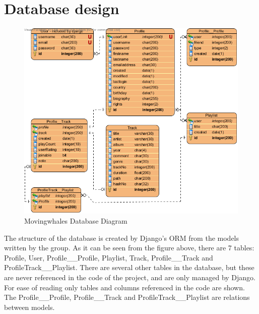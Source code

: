 \section{Database design}
\begin{figure}[h!]
\centering
\includegraphics[scale=0.5]{design/figures/mwdbdiagram}
\caption{Movingwhales Database Diagram}
\end{figure}
The structure of the database is created by Django's ORM from the models written by the group. As it can be seen from the figure above, there
are 7 tables: Profile, User, Profile\_\_Profile, Playlist, Track, Profile\_\_Track and 
ProfileTrack\_\_Playlist. There are several other tables in the database, but these are never referenced in the code of the 
project, and are only managed by Django. For ease of reading only tables and columns referenced in the code are shown. The 
Profile\_\_Profile, Profile\_\_Track and ProfileTrack\_\_Playlist are relations between models.
